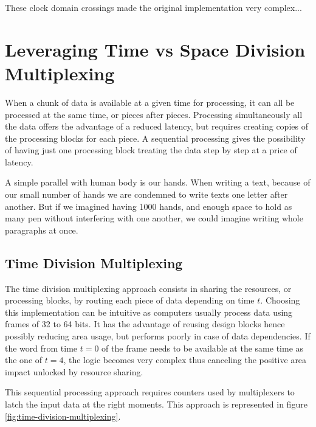 These clock domain crossings made the original implementation very complex...

\section{Leveraging Time vs Space Division Multiplexing}\label{sec:leveraging-time-division-multiplexing}

When a chunk of data is available at a given time for processing, it can all be processed at the same time, or pieces after pieces.
Processing simultaneously all the data offers the advantage of a reduced latency, but requires creating copies of the processing 
blocks for each piece. A sequential processing gives the possibility of having just one processing block treating the data step 
by step at a price of latency.

A simple parallel with human body is our hands. When writing a text, because of our small number of hands we are condemned to write 
texts one letter after another. But if we imagined having 1000 hands, and enough space to hold as many pen without interfering with one another,
we could imagine writing whole paragraphs at once.


\subsection{Time Division Multiplexing}\label{sec:time-division-multiplexing}
The time division multiplexing approach consists in sharing the resources, or processing blocks, by routing each piece of data depending on time \(t\). Choosing this implementation can be intuitive as computers usually process data using frames of 32 to 64 bits. It has the advantage of reusing design blocks hence possibly reducing area usage, but performs poorly in case of data dependencies. If the word from time \(t=0\) of the frame needs to be available at the same time as the one of \(t=4\), the logic becomes very complex thus canceling the positive area impact unlocked by resource sharing.

This sequential processing approach requires counters used by multiplexers to latch the input data at the right moments. This approach is represented in figure \ref{fig:time-division-multiplexing}.

